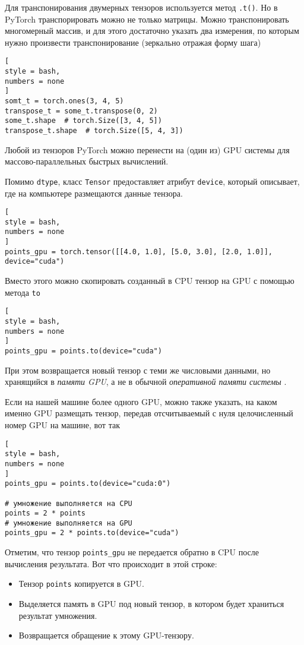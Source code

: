 \documentclass[%
	11pt,
	a4paper,
	utf8,
		]{article}
\begin{document}
Для транспонирования двумерных тензоров используется метод \verb|.t()|. Но в PyTorch транспорировать можно не только матрицы. Можно транспонировать многомерный массив, и для этого достаточно указать два измерения, по которым нужно произвести транспонирование (зеркально отражая форму шага)
\begin{lstlisting}[
style = bash,
numbers = none
]
somt_t = torch.ones(3, 4, 5)
transpose_t = some_t.transpose(0, 2)
some_t.shape  # torch.Size([3, 4, 5])
transpose_t.shape  # torch.Size([5, 4, 3])
\end{lstlisting}

Любой из тензоров PyTorch можно перенести на (один из) GPU системы для массово-параллельных быстрых вычислений.

Помимо \verb|dtype|, класс \verb|Tensor| предоставляет атрибут \verb|device|, который описывает, где на компьютере размещаются данные тензора. 
\begin{lstlisting}[
style = bash,
numbers = none
]
points_gpu = torch.tensor([[4.0, 1.0], [5.0, 3.0], [2.0, 1.0]], device="cuda")
\end{lstlisting}

Вместо этого можно скопировать созданный в CPU тензор на GPU с помощью метода \verb|to|
\begin{lstlisting}[
style = bash,
numbers = none	
]
points_gpu = points.to(device="cuda")
\end{lstlisting}

При этом возвращается новый тензор с теми же числовыми данными, но хранящийся в \emph{памяти GPU}, {\color{red}а не в обычной \emph{оперативной памяти системы}} \cite[]{pytorch-2022}.

Если на нашей машине более одного GPU, можно также указать, на каком именно GPU размещать тензор, передав отсчитываемый с нуля целочисленный номер GPU на машине, вот так
\begin{lstlisting}[
style = bash,
numbers = none	
]
points_gpu = points.to(device="cuda:0")

# умножение выполняется на CPU
points = 2 * points
# умножение выполняется на GPU
points_gpu = 2 * points.to(device="cuda")
\end{lstlisting}

Отметим, что тензор \verb|points_gpu| не передается обратно в CPU после вычисления результата. Вот что происходит в этой строке:
\begin{itemize}
	\item Тензор \verb|points| копируется в GPU.
	
	\item Выделяется память в GPU под новый тензор, в котором будет храниться результат умножения.
	
	\item Возвращается обращение к этому GPU-тензору.
\end{itemize}
\end{document}

